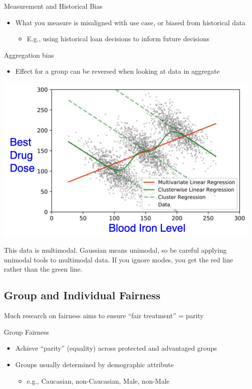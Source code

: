 \documentclass[11pt]{article}
\theoremstyle{definition}
\begin{document}
Measurement and Historical Bias
\begin{itemize}
    \item What you measure is misaligned with
    use case, or biased from historical data
    \begin{itemize}
        \item E.g., using historical loan decisions to
        inform future decisions
    \end{itemize}
\end{itemize}

Aggregation bias
\begin{itemize}
    \item Effect for a group can be reversed
    when looking at data in aggregate
\end{itemize}

\includegraphics[width = \textwidth/2]{2.png}

This data is multimodal. Gaussian means unimodal, so be careful
applying unimodal tools to multimodal data.
If you ignore modes, you get the red line rather
than the green line.

\subsection{Group and Individual Fairness}
Much research on fairness aims to ensure “fair treatment” = parity

Group Fairness
\begin{itemize}
    \item Achieve “parity” (equality) across protected and advantaged groups
    \item Groups usually determined by demographic attribute
    \begin{itemize}
        \item e.g., {Caucasian, non-Caucasian}, {Male, non-Male}
    \end{itemize}
\end{itemize}
\end{document}
